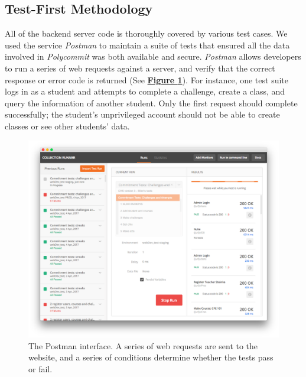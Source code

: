 
\subsection{Test-First Methodology}
\par All of the backend server code is thoroughly covered by various test cases. We used the service \textit{Postman} to maintain a suite of tests that ensured all the data involved in \textit{Polycommit} was both available and secure. \textit{Postman} allows developers to run a series of web requests against a server, and verify that the correct response or error code is returned (See  \textbf{\hyperref[fig:postman]{Figure \ref*{fig:postman}}}). For instance, one test suite logs in as a student and attempts to complete a challenge, create a class, and query the information of another student. Only the first request should complete successfully; the student's unprivileged account should not be able to create classes or see other students' data.

\begin{figure}
	\includegraphics[width=1.1\linewidth]{figures/postman}
	\caption{The Postman interface. A series of web requests are sent to the website, and a series of conditions determine whether the tests pass or fail.}
	\label{fig:postman}
\end{figure}

